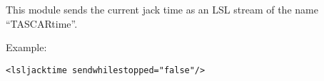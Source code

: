 This module sends the current jack time as an LSL stream of the name ``TASCARtime''.

Example:
\begin{lstlisting}[numbers=none]
<lsljacktime sendwhilestopped="false"/>
\end{lstlisting}


